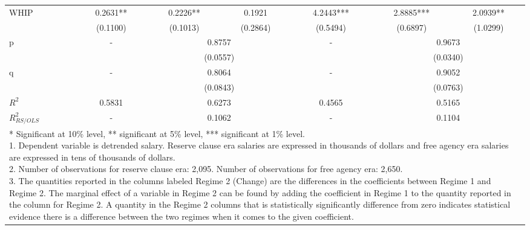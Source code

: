 \documentclass[12pt]{article}
\begin{document}
\begin{sidewaystable}
\begin{center}
\begin{tabular}{l|c|cc|c|cc}
 \multirow{2}{*}{WHIP} & 0.2631** & 0.2226** & 0.1921  & 4.2443*** & 2.8885*** & 2.0939** \\ 
 & (0.1100) & (0.1013) & (0.2864) & (0.5494) & (0.6897) & (1.0299) \\ [0.4pc]\hline 
\multirow{2}{*}{p} & - & \multicolumn{2}{c|}{0.8757} & - & \multicolumn{2}{c}{0.9673} \\ 
 & & \multicolumn{2}{c|}{(0.0557)} & & \multicolumn{2}{c}{(0.0340)} \\ [0.4pc] 
\multirow{2}{*}{q} & - & \multicolumn{2}{c|}{0.8064} & - & \multicolumn{2}{c}{0.9052} \\ 
 & & \multicolumn{2}{c|}{(0.0843)} & & \multicolumn{2}{c}{(0.0763)} \\ \hline 
$R^2$ & 0.5831 & \multicolumn{2}{c|}{0.6273} & 0.4565 & \multicolumn{2}{c}{0.5165} \\ 
$R_{RS/OLS}^2$ & - & \multicolumn{2}{c|}{0.1062} & - & \multicolumn{2}{c}{0.1104} \\ \hline
\multicolumn{7}{p{7.5in}}{\footnotesize{
* Significant at 10\% level, ** significant at 5\% level, *** significant at 1\% level.\newline
1. Dependent variable is detrended salary.  Reserve clause era salaries are expressed in thousands of dollars and free agency era salaries are expressed in tens of thousands of dollars.\newline
2. Number of observations for reserve clause era: 2,095.  Number of observations for free agency era: 2,650. \newline
3. The quantities reported in the columns labeled Regime 2 (Change) are the differences in the coefficients between Regime 1 and Regime 2.  The marginal effect of a variable in Regime 2 can be found by adding the coefficient in Regime 1 to the quantity reported in the column for Regime 2.  A quantity in the Regime 2 columns that is statistically significantly difference from zero indicates statistical evidence there is a difference between the two regimes when it comes to the given coefficient.}}
\end{tabular}
\end{center}
\end{sidewaystable}
\end{document}
